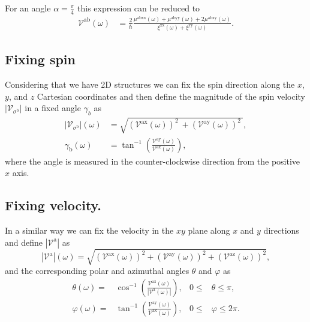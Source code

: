 \documentclass[prb,11pt,tightenlines,twocolumn,aps]{revtex4-1}
\begin{document}
For an angle $\alpha = \frac{\pi}{4}$ this expression can be reduced to 
\begin{align}
\mathcal{V}^{\mathrm{ab}} (\omega)
&= \frac{2}{\hbar}
\frac{\mu^{\mathrm{abxx}}(\omega) + \mu^{\mathrm{abyy}}(\omega) + 
2\mu^{\mathrm{abxy}}(\omega)}
{\xi^{\mathrm{xx}}(\omega) + \xi^{\mathrm{yy}}(\omega)}.
\label{eq:vab-90deg}
\end{align}



\subsection{Fixing spin}\label{sec:theory-fixspin}
Considering that we have 2D structures we can fix the spin direction along the
$x$, $y$, and $z$ Cartesian coordinates and then define the magnitude of the
spin velocity $|\mathcal{V}_{\sigma^{\mathrm{b}}}|$ in a fixed angle
$\gamma_{b}$ as
\begin{align}
|\mathcal{V}_{\sigma^{\mathrm{b}}}| (\omega)
&=
\sqrt{
(\mathcal{V}^{\mathrm{ax}}(\omega))^{2}\ +
(\mathcal{V}^{\mathrm{ay}}(\omega))^{2}\ 
}, 
\label{eq:vs-mag}
\\
\gamma_{\mathrm{b}} (\omega)
&=
\tan^{-1} \left( \frac{\mathcal{V}^{\mathrm{ay}}(\omega)}
{\mathcal{V}^{\mathrm{ax}}(\omega)} \right),
\label{eq:gamma-ang}
\end{align}
where the angle is measured in the counter-clockwise direction from the positive
$x$ axis.


\subsection{Fixing velocity.}\label{sec:theory-fixvel}

In a similar way we can fix the velocity in the $xy$ plane
along $x$ and $y$ directions and define $|\mathcal{V}^{\mathrm{a}}|$ as
\begin{equation}
|\mathcal{V}^{\mathrm{a}}| (\omega)= 
\sqrt {
(\mathcal{V}^{\mathrm{ax}}(\omega))^{2} +
(\mathcal{V}^{\mathrm{ay}}(\omega))^{2} +
(\mathcal{V}^{\mathrm{az}}(\omega))^{2} 
},
\label{eq:vv-mag}
\end{equation}
and the corresponding polar and azimuthal angles $\theta$ and $\varphi$ as
\begin{align}
\theta  (\omega)
=& 
\cos^{-1} \left( \frac{\mathcal{V}^{\mathrm{az}}(\omega)}
{|\mathcal{V}^{\mathrm{a}}(\omega)|} \right),
& 0 \leq &\theta \leq \pi, 
\label{eq:polar-ang}
\\
\varphi (\omega)
=& 
\tan^{-1} \left( \frac{\mathcal{V}^{\mathrm{ay}}(\omega)}
{\mathcal{V}^{\mathrm{ax}}(\omega)} \right),
& 0 \leq &\varphi \leq 2\pi.
\label{eq:azimuthal-ang} 
\end{align}
\end{document}
